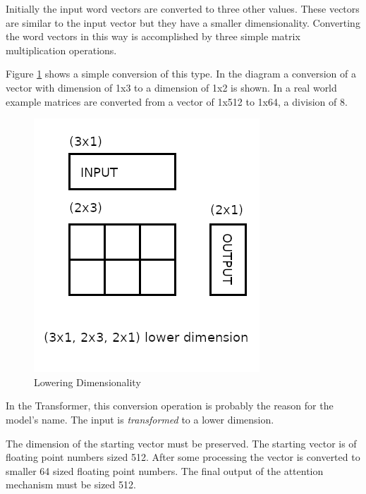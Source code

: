 Initially the input word vectors are converted to three other values. These vectors are similar to the input vector but they have a smaller dimensionality. Converting the word vectors in this way is accomplished by three simple matrix multiplication operations.

Figure \ref{diagram-mat-mult-01} shows a simple conversion of this type. In the diagram a conversion of a vector with dimension of 1x3 to a dimension of 1x2 is shown. In a real world example matrices are converted from a vector of 1x512 to 1x64, a division of 8.



\begin{figure}[H]
	\begin{center}
		
	
	\includegraphics[scale=0.5]{diagram-mat01}
\end{center}
	\caption[Lowering Dimensionality]{Lowering Dimensionality}
	
	\label{diagram-mat-mult-01}
\end{figure}

In the Transformer, this conversion operation is probably the reason for the model's name. The input is \textit{transformed} to a lower dimension. 

The dimension of the starting vector must be preserved. The starting vector is of floating point numbers sized 512. After some processing the vector is converted to smaller 64 sized floating point numbers. The final output of the attention mechanism must be sized 512. %

